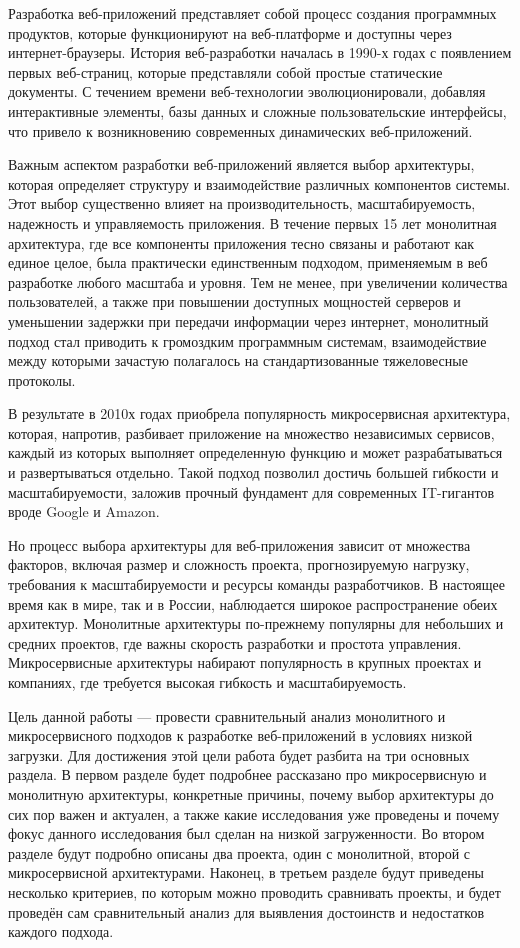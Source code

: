 
Разработка веб-приложений представляет собой процесс создания программных продуктов, которые функционируют на веб-платформе и доступны через интернет-браузеры. История веб-разработки началась в 1990-х годах с появлением первых веб-страниц, которые представляли собой простые статические документы. С течением времени веб-технологии эволюционировали, добавляя интерактивные элементы, базы данных и сложные пользовательские интерфейсы, что привело к возникновению современных динамических веб-приложений.

Важным аспектом разработки веб-приложений является выбор архитектуры, которая определяет структуру и взаимодействие различных компонентов системы. Этот выбор существенно влияет на производительность, масштабируемость, надежность и управляемость приложения. В течение первых 15 лет монолитная архитектура, где все компоненты приложения тесно связаны и работают как единое целое, была практически единственным подходом, применяемым в веб разработке любого масштаба и уровня. Тем не менее, при увеличении количества пользователей, а также при повышении доступных мощностей серверов и уменьшении задержки при передачи информации через интернет, монолитный подход стал приводить к громоздким программным системам, взаимодействие между которыми зачастую полагалось на стандартизованные тяжеловесные протоколы.

В результате в 2010х годах приобрела популярность микросервисная архитектура, которая, напротив, разбивает приложение на множество независимых сервисов, каждый из которых выполняет определенную функцию и может разрабатываться и развертываться отдельно. Такой подход позволил достичь большей гибкости и масштабируемости, заложив прочный фундамент для современных IT-гигантов вроде Google и Amazon.

Но процесс выбора архитектуры для веб-приложения зависит от множества факторов, включая размер и сложность проекта, прогнозируемую нагрузку, требования к масштабируемости и ресурсы команды разработчиков. В настоящее время как в мире, так и в России, наблюдается широкое распространение обеих архитектур. Монолитные архитектуры по-прежнему популярны для небольших и средних проектов, где важны скорость разработки и простота управления. Микросервисные архитектуры набирают популярность в крупных проектах и компаниях, где требуется высокая гибкость и масштабируемость.

Цель данной работы — провести сравнительный анализ монолитного и микросервисного подходов к разработке веб-приложений в условиях низкой загрузки. Для достижения этой цели работа будет разбита на три основных раздела. В первом разделе будет подробнее рассказано про микросервисную и монолитную архитектуры,  конкретные причины, почему выбор архитектуры до сих пор важен и актуален, а также какие исследования уже проведены и почему фокус данного исследования был сделан на низкой загруженности. Во втором разделе будут подробно описаны два проекта, один с монолитной, второй с микросервисной архитектурами. Наконец, в третьем разделе будут приведены несколько критериев, по которым можно проводить сравнивать проекты, и будет проведён сам сравнительный анализ для выявления достоинств и недостатков каждого подхода.

